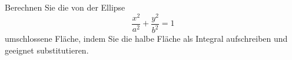 \begin{atiTask}[
  title = Fläche einer Ellipse,
  call = Zusatzaufgabe,
]
 Berechnen Sie die von der Ellipse 
 \begin{equation*}
\frac{x^2}{a^2}+\frac{y^2}{b^2}=1
 \end{equation*}
 umschlossene Fläche, indem Sie die halbe Fläche als Integral aufschreiben und geeignet substitutieren.
\end{atiTask}